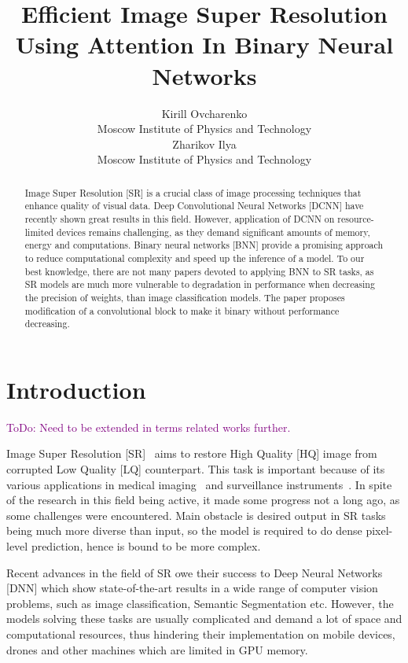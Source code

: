 \documentclass{article}
\title{Efficient Image Super Resolution Using Attention In Binary Neural Networks}
\author{Kirill Ovcharenko \\
	Moscow Institute of Physics and Technology\\
	\And
	Zharikov Ilya \\
	Moscow Institute of Physics and Technology\\
}
\date{}
\newcommand{\TODO}[1]{\textcolor{purple}{ToDo: #1.}}
\begin{document}
\maketitle

\begin{abstract}
Image Super Resolution [SR] is a crucial class of image processing techniques that enhance quality of visual data. 
Deep Convolutional Neural Networks [DCNN] have recently shown great results in this field. However, application of DCNN on resource-limited devices remains challenging, as they demand significant amounts of memory, energy and computations. Binary neural networks [BNN] provide a promising approach to reduce computational complexity and speed up the inference of a model. To our best knowledge, there are not many papers devoted to applying BNN to SR tasks, as SR models are much more vulnerable to degradation in performance when decreasing the precision of weights, than image classification models. The paper proposes modification of a convolutional block to make it binary without performance decreasing.

\end{abstract}



\section{Introduction}

\TODO{Need to be extended in terms related works further}

Image Super Resolution [SR]~\cite{wang2020deep} aims to restore High Quality [HQ] image from corrupted Low Quality [LQ] counterpart. This task is important because of its various applications in medical imaging~\cite{dharejo2022multimodal} and surveillance instruments~\cite{aakerberg2022real}. In spite of the research in this field being active, it made some progress not a long ago, as some challenges were encountered. Main obstacle is desired output in SR tasks being much more diverse than input, so the model is required to do dense pixel-level prediction, hence is bound to be more complex.  

Recent advances in the field of SR owe their success to Deep Neural Networks [DNN] which show state-of-the-art results in a wide range of computer vision problems, such as image classification, Semantic Segmentation etc. However, the models solving these tasks are usually complicated and demand a lot of space and computational resources, thus hindering their implementation on mobile devices, drones and other machines which are limited in GPU memory.
\end{document}
